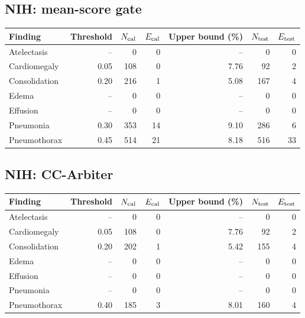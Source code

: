 \subsection{NIH: mean-score gate}
\begin{center}\small
\begin{tabular}{lrrrrrr}
\toprule
Finding & Threshold & $N_{\rm cal}$ & $E_{\rm cal}$ & Upper bound (\%) & $N_{\rm test}$ & $E_{\rm test}$\\
\midrule
Atelectasis & -- & 0 & 0 & -- & 0 & 0\\
Cardiomegaly & 0.05 & 108 & 0 & 7.76 & 92 & 2\\
Consolidation & 0.20 & 216 & 1 & 5.08 & 167 & 4\\
Edema & -- & 0 & 0 & -- & 0 & 0\\
Effusion & -- & 0 & 0 & -- & 0 & 0\\
Pneumonia & 0.30 & 353 & 14 & 9.10 & 286 & 6\\
Pneumothorax & 0.45 & 514 & 21 & 8.18 & 516 & 33\\
\bottomrule\end{tabular}\end{center}
\subsection{NIH: CC-Arbiter}
\begin{center}\small
\begin{tabular}{lrrrrrr}
\toprule
Finding & Threshold & $N_{\rm cal}$ & $E_{\rm cal}$ & Upper bound (\%) & $N_{\rm test}$ & $E_{\rm test}$\\
\midrule
Atelectasis & -- & 0 & 0 & -- & 0 & 0\\
Cardiomegaly & 0.05 & 108 & 0 & 7.76 & 92 & 2\\
Consolidation & 0.20 & 202 & 1 & 5.42 & 155 & 4\\
Edema & -- & 0 & 0 & -- & 0 & 0\\
Effusion & -- & 0 & 0 & -- & 0 & 0\\
Pneumonia & -- & 0 & 0 & -- & 0 & 0\\
Pneumothorax & 0.40 & 185 & 3 & 8.01 & 160 & 4\\
\bottomrule\end{tabular}\end{center}
